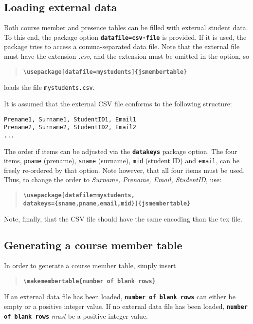 \documentclass[english]{article}
\newcommand*\jmacro[1]{\textbf{\texttt{#1}}}
\newcommand*\jcsmacro[1]{\jmacro{\textbackslash{#1}}}
\newcommand*\joption[1]{\textbf{\texttt{#1}}}
\newcommand*\jparam[1]{\angus #1\angud}
\begin{document}
\subsection{Loading external data}\label{sec:ext-data} 

Both course member and presence tables can be filled with external student data. To this end,
the package option \joption{datafile=\jparam{csv-file}} is provided. If it is used, the package tries
to access a comma-separated data file. Note that the external file must have the extension \emph{.csv},
and the extension must be omitted in the option, so
\begin{quote}
 \jcsmacro{usepackage[datafile=mystudents]\{jsmembertable\}}
\end{quote}
loads the file \texttt{mystudents.csv}.

It is assumed that the external CSV file conforms to the following structure:
\begin{lstlisting}[language={},basicstyle={\small\ttfamily},frame=single]
Prename1, Surname1, StudentID1, Email1
Prename2, Surname2, StudentID2, Email2
...
\end{lstlisting}
The order if items can be adjusted via the \joption{datakeys} package option.
The four items, \texttt{pname} (prename), \texttt{sname} (surname), \texttt{mid} (student ID) and \texttt{email}, can be freely re-ordered by that option. Note however, that all four items must be used. Thus, to change the order to \emph{Surname, Prename, Email, StudentID}, use:
\begin{quote}
	\jcsmacro{usepackage[datafile=mystudents,\\
	\hphantom{\textbackslash usepackage[}datakeys=\{sname,pname,email,mid\}]\{jsmembertable\}}
\end{quote}
Note, finally, that the CSV file should have the same encoding than the tex file.

\subsection{Generating a course member table}

In order to generate a course member table, simply insert

\begin{quote}
\jcsmacro{makemembertable\{\jparam{number of blank rows}\}}
\end{quote}
If an external data file has been loaded, \joption{\jparam{number of blank rows}} can either be empty or a positive
integer value. If no external data file has been loaded, \joption{\jparam{number of blank rows}} \emph{must} be a
positive integer value.
\end{document}
